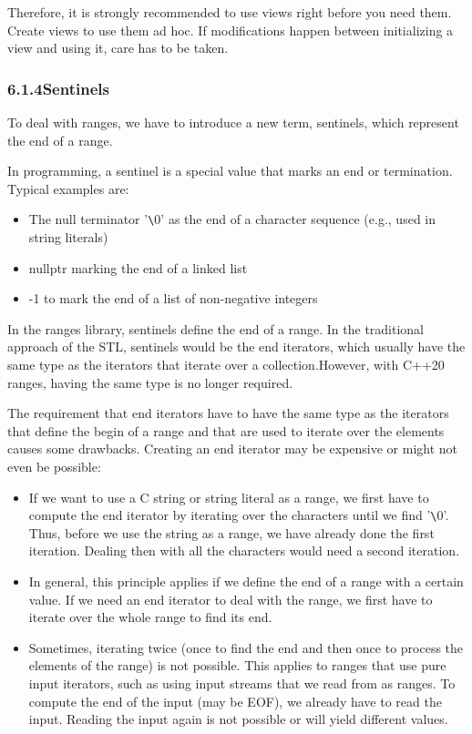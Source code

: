 Therefore, it is strongly recommended to use views right before you need them. Create views to use them ad hoc. If modifications happen between initializing a view and using it, care has to be taken.

\subsubsection*{ 6.1.4\hspace{0.2cm}Sentinels}

To deal with ranges, we have to introduce a new term, sentinels, which represent the end of a range.

In programming, a sentinel is a special value that marks an end or termination. Typical examples are:

\begin{itemize}
\item
The null terminator ’\verb|\|0’ as the end of a character sequence (e.g., used in string literals)

\item
nullptr marking the end of a linked list

\item
-1 to mark the end of a list of non-negative integers
\end{itemize}

In the ranges library, sentinels define the end of a range. In the traditional approach of the STL, sentinels would be the end iterators, which usually have the same type as the iterators that iterate over a collection.However, with C++20 ranges, having the same type is no longer required.

The requirement that end iterators have to have the same type as the iterators that define the begin of a range and that are used to iterate over the elements causes some drawbacks. Creating an end iterator may be expensive or might not even be possible:

\begin{itemize}
\item
If we want to use a C string or string literal as a range, we first have to compute the end iterator by iterating over the characters until we find ’\verb|\|0’. Thus, before we use the string as a range, we have already done the first iteration. Dealing then with all the characters would need a second iteration.

\item
In general, this principle applies if we define the end of a range with a certain value. If we need an end iterator to deal with the range, we first have to iterate over the whole range to find its end.

\item
Sometimes, iterating twice (once to find the end and then once to process the elements of the range) is not possible. This applies to ranges that use pure input iterators, such as using input streams that we read from as ranges. To compute the end of the input (may be EOF), we already have to read the input. Reading the input again is not possible or will yield different values.
\end{itemize}

